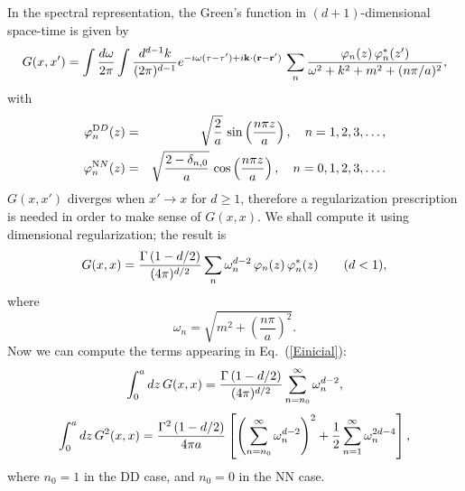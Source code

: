 \documentclass[a4paper,dvips,12pt]{article}
\begin{document}
In the spectral representation, the Green's function in $(d+1)$-dimensional
space-time is given by
\begin {equation}
G(x,x')=\int {d\omega\over 2\pi}\int {d^{d-1}k\over(2\pi)^{d-1}}
e^{-i\omega(\tau-\tau')+i{\bf k}\cdot({\bf r}-{\bf r}')}\,
\sum_{n}{\varphi_{n}(z)\,\varphi_{n}^{*}(z')\over
\omega^{2}+k^{2}+m^{2}+(n\pi/a)^{2}},
\end {equation}
with
\begin {eqnarray}
\varphi_{n}^{\textrm DD}(z)&=&\sqrt{2\over a}\,\sin\left(\frac{n\pi z}{a}\right),
\quad n=1,2,3,\ldots,
\\
\varphi_{n}^{\textrm NN}(z)&=&\sqrt{2-\delta_{n,0}\over a}\,
\cos\left(\frac{n\pi z}{a}\right),
\quad n=0,1,2,3,\ldots.
\end {eqnarray}
$G(x,x')$ diverges when $x'\to x$ for $d\ge 1$, therefore a regularization
prescription is needed in order to make sense of $G(x,x)$. We shall
compute it using dimensional regularization; the result is
\begin {equation}
\label {zxc1}
G(x,x)={\Gamma\left(1-d/2\right)\over(4\pi)^{d/2}}
\sum_{n}\omega_{n}^{d-2}\,\varphi_{n}(z)\,\varphi_{n}^{*}(z)\qquad(d<1),
\end {equation}
where
\begin {equation}
\omega_{n}=\sqrt{m^{2}+\left(\frac{n\pi}{a}\right)^{2}}.
\end {equation}
Now we can compute the terms appearing in Eq.\ (\ref{Einicial}):
\begin{equation}
\int_{0}^{a}dz\,G(x,x)=
{\Gamma\left(1-d/2\right)\over(4\pi)^{d/2}}
\sum_{n=n_0}^{\infty}\omega_{n}^{d-2},
\end{equation}
\begin {equation}
\int_{0}^{a}dz\, G^{2}(x,x)=
{\Gamma^{2}\left(1-d/2\right)\over 4\pi a}
\left[\left(\sum_{n=n_0}^{\infty}\omega_{n}^{d-2}\right)^{2}
+{1\over 2}\sum_{n=1}^{\infty}\omega_{n}^{2d-4}\right],
\end{equation}
where $n_0=1$ in the DD case, and $n_0=0$ in the NN case.
\end{document}
